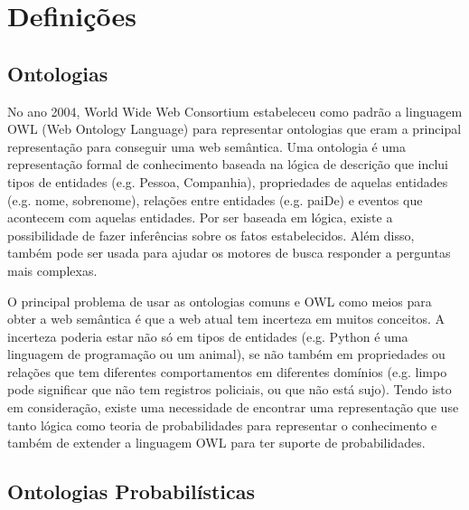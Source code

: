 \section{Definições}
\label{sec:definitions}

\subsection{Ontologias}
\label{subsec:ontolgy}

No ano 2004, World Wide Web Consortium estabeleceu como padrão a linguagem OWL (Web Ontology Language) para representar ontologias que eram a principal representação para conseguir uma web semântica. Uma ontologia é uma representação formal de conhecimento baseada na lógica de descrição que inclui tipos de entidades (e.g. Pessoa, Companhia), propriedades de aquelas entidades (e.g. nome, sobrenome), relações entre entidades (e.g. paiDe) e eventos que acontecem com aquelas entidades. Por ser baseada em lógica, existe a possibilidade de fazer inferências sobre os fatos estabelecidos. Além disso, também pode ser usada para ajudar os motores de busca responder a perguntas mais complexas.

O principal problema de usar as ontologias comuns e OWL como meios para obter a web semântica é que a web atual tem incerteza em muitos conceitos. A incerteza poderia estar não só em tipos de entidades (e.g. Python é uma linguagem de programação ou um animal), se não também em propriedades ou relações que tem diferentes comportamentos em diferentes domínios (e.g. limpo pode significar que não tem registros policiais, ou que não está sujo). Tendo isto em consideração, existe uma necessidade de encontrar uma representação que use tanto lógica como teoria de probabilidades para representar o conhecimento e também de extender a linguagem OWL para ter suporte de probabilidades.

\subsection{Ontologias Probabilísticas}
\label{subsec:prob_ontology}